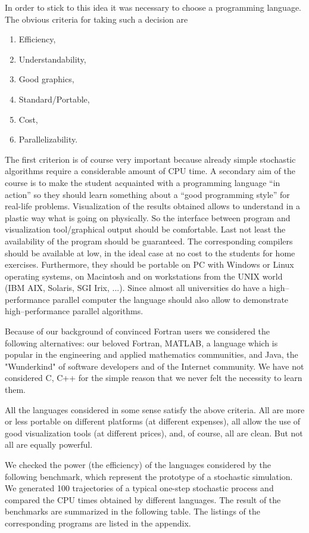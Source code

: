 In order to stick to this idea it was necessary to choose a programming 
language. The obvious criteria for taking such a decision are
\cite[]{GARCIA}
\begin{enumerate}
\item Efficiency,
\item Understandability,
\item Good graphics,
\item Standard/Portable,
\item Cost,
\item Parallelizability.
\end{enumerate}
The first criterion is of course very important because already simple 
stochastic algorithms require a considerable amount of CPU time.
A secondary aim of the course is to make the student acquainted with a 
programming language ``in action'' so they should learn something 
about a ``good 
programming style'' for real-life problems. Visualization of the results 
obtained allows to understand in a plastic way what is going on physically. So 
the interface between program and visualization tool/graphical output should
be comfortable. Last not least the availability of the program should be
guaranteed. The corresponding compilers should be available at low, in the 
ideal case at no cost to the students for home exercises. Furthermore, they
should be portable on PC with Windows or Linux operating systems, on Macintosh
and on workstations from the UNIX world (IBM AIX, Solaris, SGI Irix, ...).
Since almost all universities do have a high--performance parallel computer 
the language should also allow to demonstrate high--performance parallel 
algorithms.

Because of our background of convinced Fortran users we considered the 
following alternatives: our beloved Fortran, MATLAB, a language which 
is popular in 
the engineering and applied mathematics communities, and Java, the 
"Wunderkind" of software developers and of the Internet community. We have 
not considered C, C++ for the simple reason that we never felt the necessity 
to learn them.

All the languages considered  in some sense satisfy the above criteria. All
are more  or less portable on different platforms (at different expenses), all
allow the use of good visualization tools (at different prices), and, of 
course, all are clean. But not all are equally powerful. 

We checked the power (the efficiency) of the languages considered by the 
following benchmark, which represent the prototype of a stochastic simulation. 
We generated 100 trajectories of a typical one-step stochastic process
and compared the CPU times obtained by different languages. The result
of the benchmarks are summarized in the following table. The listings
of the corresponding programs are listed in the appendix.

